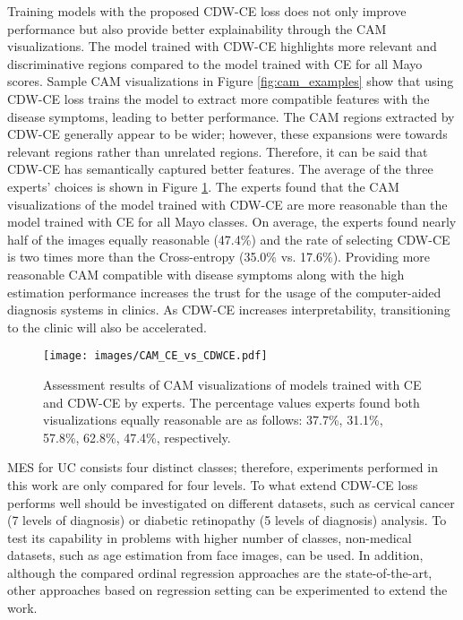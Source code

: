 \documentclass[runningheads]{llncs}
\begin{document}
Training models with the proposed CDW-CE loss does not only improve performance but also provide better explainability through the CAM visualizations. The model trained with CDW-CE highlights more relevant and discriminative regions compared to the model trained with CE for all Mayo scores. Sample CAM visualizations in Figure \ref{fig:cam_examples} show that using CDW-CE loss trains the model to extract more compatible features with the disease symptoms, leading to better performance. The CAM regions extracted by CDW-CE generally appear to be wider; however, these expansions were towards relevant regions rather than unrelated regions. Therefore, it can be said that CDW-CE has semantically captured better features. The average of the three experts' choices is shown in Figure \ref{fig:cam_comparsion_result}. The experts found that the CAM visualizations of the model trained with CDW-CE are more reasonable than the model trained with CE for all Mayo classes. On average, the experts found nearly half of the images equally reasonable (47.4\%) and the rate of selecting CDW-CE is two times more than the Cross-entropy (35.0\% vs. 17.6\%). Providing more reasonable CAM compatible with disease symptoms along with the high estimation performance increases the trust for the usage of the computer-aided diagnosis systems in clinics. As CDW-CE increases interpretability, transitioning to the clinic will also be accelerated.

\begin{figure}[t!]
  \centering
  \texttt{[image: images/CAM\_CE\_vs\_CDWCE.pdf]}
  \caption{Assessment results of CAM visualizations of models trained with CE and CDW-CE by experts. The percentage values experts found both visualizations equally reasonable are as follows: 37.7\%, 31.1\%, 57.8\%, 62.8\%, 47.4\%, respectively.}
  \label{fig:cam_comparsion_result}
\end{figure}



MES for UC consists four distinct classes; therefore, experiments performed in this work are only compared for four levels. To what extend CDW-CE loss performs well should be investigated on different datasets, such as cervical cancer (7 levels of diagnosis) or diabetic retinopathy (5 levels of diagnosis) analysis. To test its capability in problems with higher number of classes, non-medical datasets, such as age estimation from face images, can be used. In addition, although the compared ordinal regression approaches are the state-of-the-art, other approaches based on regression setting can be experimented to extend the work.
\end{document}
